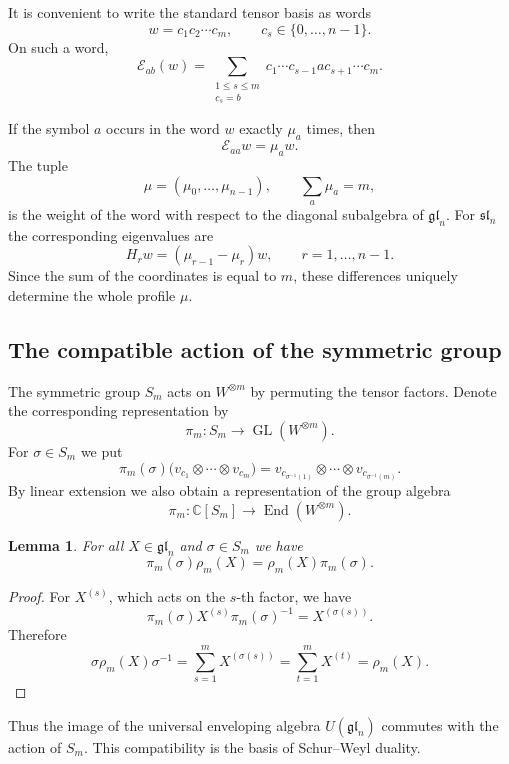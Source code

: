 \documentclass[12pt,reqno]{amsart}
\newtheorem{lemma}[theorem]{Lemma}
\newcommand{\End}{\operatorname{End}}
\begin{document}
It is convenient to write the standard tensor basis as words
$$
w=c_1c_2\cdots c_m,
\qquad
c_s\in\{0,\dots,n-1\}.
$$
On such a word,
\begin{equation*}
\mathcal E_{ab}(w)
=
\sum_{\substack{1\le s\le m\\c_s=b}}
 c_1\cdots c_{s-1}a c_{s+1}\cdots c_m.
\end{equation*}

If the symbol $a$ occurs in the word $w$ exactly $\mu_a$ times, then
$$
\mathcal E_{aa}w=\mu_aw.
$$
The tuple
$$
\mu=(\mu_0,\dots,\mu_{n-1}),
\qquad
\sum_a\mu_a=m,
$$
is the weight of the word with respect to the diagonal subalgebra of
$\mathfrak{gl}_n$. For $\mathfrak{sl}_n$ the corresponding eigenvalues are
$$
H_rw=(\mu_{r-1}-\mu_r)w,
\qquad
r=1,\dots,n-1.
$$
Since the sum of the coordinates is equal to $m$, these differences
uniquely determine the whole profile $\mu$.

\subsection{The compatible action of the symmetric group}


The symmetric group $S_m$ acts on $W^{\otimes m}$ by permuting the tensor
factors. Denote the corresponding representation by
$$
\pi_m:S_m\longrightarrow\operatorname{GL}(W^{\otimes m}).
$$
For $\sigma\in S_m$ we put
$$
\pi_m(\sigma)
\bigl(
v_{c_1}\otimes\cdots\otimes v_{c_m}
\bigr)
=
v_{c_{\sigma^{-1}(1)}}\otimes\cdots\otimes
v_{c_{\sigma^{-1}(m)}}.
$$
By linear extension we also obtain a representation of the group algebra
$$
\pi_m:\mathbb C[S_m]\longrightarrow\End(W^{\otimes m}).
$$


\begin{lemma}
For all $X\in\mathfrak{gl}_n$ and $\sigma\in S_m$ we have
$$
\pi_m(\sigma)\rho_m(X)
=
\rho_m(X)\pi_m(\sigma).
$$
\end{lemma}

\begin{proof}
For $X^{(s)}$, which acts on the $s$-th factor, we have
$$
\pi_m(\sigma)X^{(s)}\pi_m(\sigma)^{-1}
=
X^{(\sigma(s))}.
$$
Therefore
$$
\sigma\rho_m(X)\sigma^{-1}
=
\sum_{s=1}^m X^{(\sigma(s))}
=
\sum_{t=1}^m X^{(t)}
=
\rho_m(X).
$$
\end{proof}

Thus the image of the universal enveloping algebra
$U(\mathfrak{gl}_n)$ commutes with the action of $S_m$. This compatibility
is the basis of Schur--Weyl duality.


\end{document}
